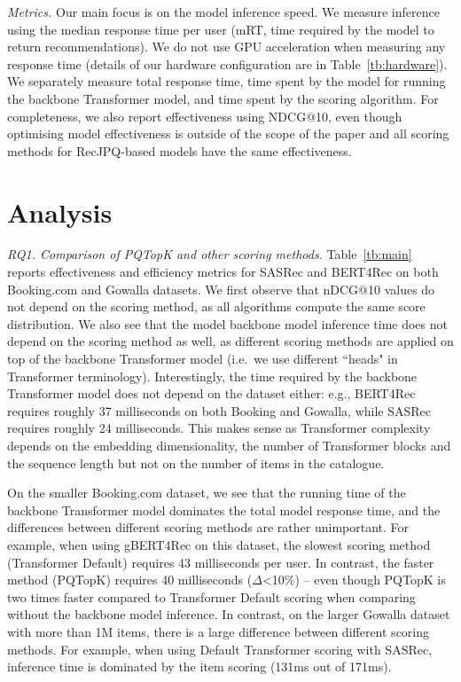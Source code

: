\documentclass[sigconf,natbib=true, review=False]{acmart} %
\newcommand{\pageenlarge}[1]{\marginnote{#1}\enlargethispage{#1\baselineskip}}
\newcommand{\rsasha}[1]{\textcolor[HTML]{000000}{#1}}
\newcommand{\scr}[1]{\textcolor[HTML]{000000}{#1}}
\newcommand{\scrc}[1]{\textcolor[HTML]{000000}{#1}}
\begin{document}
\textit{Metrics.} Our main focus is on the model inference speed. We measure inference using the median response time \scr{per user} (mRT, time required by the model to return recommendations). We do not use GPU acceleration when measuring any response time \rsasha{(details of our hardware configuration are in Table~\ref{tb:hardware})}. We separately measure total response time, time spent by the model for running the backbone Transformer model, and time spent by the scoring algorithm. For completeness, we also report effectiveness using NDCG@10, even though optimising model effectiveness is outside of the scope of the paper \scrc{and all scoring methods for RecJPQ-based models have the same effectiveness}. 






\vspace{-0.5\baselineskip}
\section{Analysis}\label{sec:results}




 \textit{RQ1. Comparison of PQTopK and other scoring methods.} Table~\ref{tb:main} reports effectiveness and efficiency metrics for SASRec and BERT4\-Rec on both Booking.com and Gowalla datasets. We first observe that nDCG@10 values do not depend on the scoring method, as all algorithms compute the same score distribution. We also see that \rsasha{the model backbone model inference time} does not depend on the scoring method as well, as different scoring methods are applied on top of the backbone Transformer model (i.e.\ we use different ``heads" in Transformer terminology). Interestingly, the time required by the backbone Transformer model does not depend on the dataset either: e.g., BERT4Rec requires roughly 37 milliseconds on both Booking and Gowalla, while SASRec requires roughly 24 milliseconds. This makes sense as Transformer complexity depends on the embedding dimensionality, the number of Transformer blocks and the sequence length but not on the number of items in the catalogue.

On the smaller Booking.com dataset, we see that \scrc{the running time of the backbone Transformer model dominates the total model response time}, and the differences between different scoring methods are rather unimportant. For example, when using gBERT4Rec on this dataset, the slowest scoring method (Transformer Default) requires 43 milliseconds per user. In contrast, the faster method (PQTopK) requires 40 milliseconds ($\Delta$<10\%) -- \rsasha{even though PQTopK is two times faster compared to Transformer Default scoring when comparing without the backbone model inference.}  In contrast, on the larger Gowalla dataset with more than 1M items, there is a large difference between different scoring methods. For example, when using Default Transformer scoring with SASRec, inference time is dominated by the item scoring (131ms out of 171ms). 
\end{document}
